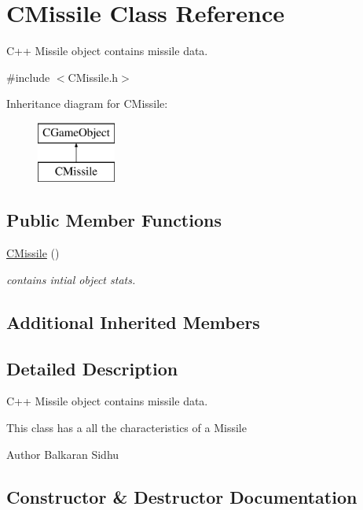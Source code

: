 \hypertarget{class_c_missile}{}\section{C\+Missile Class Reference}
\label{class_c_missile}


C++ Missile object contains missile data.  




{\ttfamily \#include $<$C\+Missile.\+h$>$}

Inheritance diagram for C\+Missile\+:\begin{figure}[H]
\begin{center}
\leavevmode
\includegraphics[height=2.000000cm]{class_c_missile}
\end{center}
\end{figure}
\subsection*{Public Member Functions}
\begin{DoxyCompactItemize}
\item 
\hyperlink{class_c_missile_a956f0b3cf58db39c91048b77410b66ef}{C\+Missile} ()
\begin{DoxyCompactList}\small\item\em contains intial object stats. \end{DoxyCompactList}\end{DoxyCompactItemize}
\subsection*{Additional Inherited Members}


\subsection{Detailed Description}
C++ Missile object contains missile data. 

This class has a all the characteristics of a Missile

\begin{DoxyAuthor}{Author}
Balkaran Sidhu 
\end{DoxyAuthor}


\subsection{Constructor \& Destructor Documentation}
\hypertarget{class_c_missile_a956f0b3cf58db39c91048b77410b66ef}{}\label{class_c_missile_a956f0b3cf58db39c91048b77410b66ef} 
